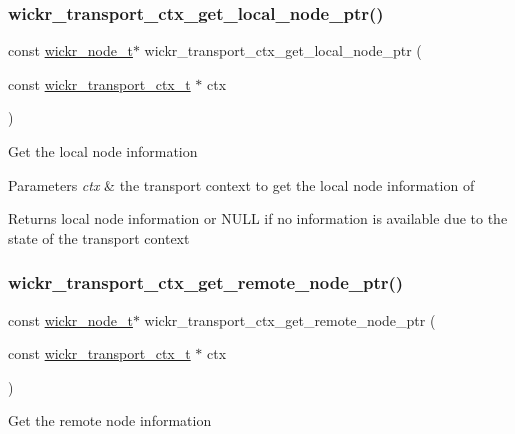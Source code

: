 \subsubsection{\texorpdfstring{wickr\_transport\_ctx\_get\_local\_node\_ptr()}{wickr\_transport\_ctx\_get\_local\_node\_ptr()}}
{\footnotesize\ttfamily const \mbox{\hyperlink{structwickr__node}{wickr\+\_\+node\+\_\+t}}$\ast$ wickr\+\_\+transport\+\_\+ctx\+\_\+get\+\_\+local\+\_\+node\+\_\+ptr (\begin{DoxyParamCaption}\item[{const \mbox{\hyperlink{structwickr__transport__ctx}{wickr\+\_\+transport\+\_\+ctx\+\_\+t}} $\ast$}]{ctx }\end{DoxyParamCaption})}

Get the local node information


\begin{DoxyParams}{Parameters}
{\em ctx} & the transport context to get the local node information of \\
\hline
\end{DoxyParams}
\begin{DoxyReturn}{Returns}
local node information or N\+U\+LL if no information is available due to the state of the transport context 
\end{DoxyReturn}
\mbox{\label{group__wickr__transport__ctx_gad9baf62b25d23b9c6ecd5cec0fc9d6f5}} 
\subsubsection{\texorpdfstring{wickr\_transport\_ctx\_get\_remote\_node\_ptr()}{wickr\_transport\_ctx\_get\_remote\_node\_ptr()}}
{\footnotesize\ttfamily const \mbox{\hyperlink{structwickr__node}{wickr\+\_\+node\+\_\+t}}$\ast$ wickr\+\_\+transport\+\_\+ctx\+\_\+get\+\_\+remote\+\_\+node\+\_\+ptr (\begin{DoxyParamCaption}\item[{const \mbox{\hyperlink{structwickr__transport__ctx}{wickr\+\_\+transport\+\_\+ctx\+\_\+t}} $\ast$}]{ctx }\end{DoxyParamCaption})}

Get the remote node information


